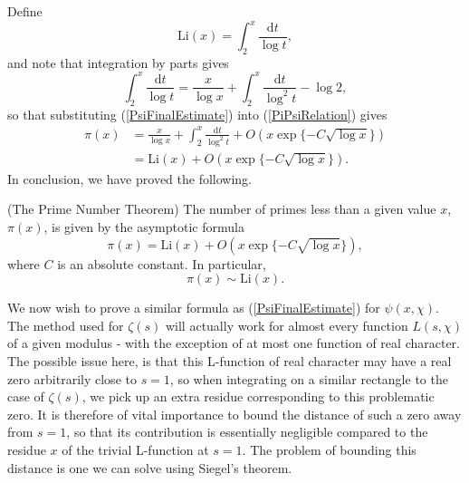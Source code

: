 Define
\begin{equation}
    \textrm{Li}(x) = \int_{2}^{x} \frac{\mathrm{d}t}{\log t}, \nonumber
\end{equation}
and note that integration by parts gives
\begin{equation}
    \int_{2}^{x} \frac{\mathrm{d}t}{\log t} = \frac{x}{\log x} + \int_{2}^{x} \frac{\mathrm{d}t}{\log^{2}t} - \log 2, \nonumber
\end{equation}
so that substituting (\ref{PsiFinalEstimate}) into (\ref{PiPsiRelation}) gives 
\begin{align}
    \pi(x) &= \frac{x}{\log x} + \int_{2}^{x} \frac{\mathrm{d}t}{\log^{2} t} + O(x \exp\{ -C \sqrt{\log x} \}) \nonumber \\
    &= \textrm{Li}(x) + O(x \exp\{ -C \sqrt{\log x} \}). \nonumber
\end{align}
In conclusion, we have proved the following.
\begin{theorem}
(The Prime Number Theorem) The number of primes less than a given value $x$, $\pi(x)$, is given by the asymptotic formula
\begin{equation}
    \pi(x) = \mathrm{Li}(x) + O(x \exp\{ -C \sqrt{\log x} \}), \nonumber
\end{equation}
where $C$ is an absolute constant. In particular, 
\begin{equation}
    \pi(x) \sim \mathrm{Li}(x). \nonumber
\end{equation}
\end{theorem}
We now wish to prove a similar formula as (\ref{PsiFinalEstimate}) for $\psi(x, \chi)$. The method used for $\zeta(s)$ will actually work for almost every function $L(s, \chi)$ of a given modulus - with the exception of at most one function of real character. The possible issue here, is that this L-function of real character may have a real zero arbitrarily close to $s = 1$, so when integrating on a similar rectangle to the case of $\zeta(s)$, we pick up an extra residue corresponding to this problematic zero. It is therefore of vital importance to bound the distance of such a zero away from $s = 1$, so that its contribution is essentially negligible compared to the residue $x$ of the trivial L-function at $s = 1$. The problem of bounding this distance is one we can solve using Siegel's theorem.

